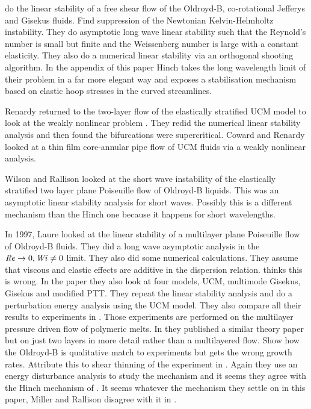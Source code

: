 \documentclass{jfm}
\newcommand\Wi{\mbox{\textit{Wi}}}
\newcommand\Rey{\mbox{\textit{Re}}}  %
\begin{document}
\citet{Azaiez1994} do the linear stability of a free shear flow of the
Oldroyd-B, co-rotational Jefferys and Gisekus fluids. Find suppression of the
Newtonian Kelvin-Helmholtz instability. They do asymptotic long wave linear
stability such that the Reynold's number is small but finite and the
Weissenberg number is large with a constant elasticity. They also do a
numerical linear stability via an orthogonal shooting algorithm. In the
appendix of this paper Hinch \citep{Azaiez1994} takes the long wavelength limit
of their problem in a far more elegant way and exposes a stabilisation
mechanism based on elastic hoop stresses in the curved streamlines.

Renardy returned to the two-layer flow of the elastically stratified UCM model
to look at the weakly nonlinear problem \citep{Renardy1995b}. They redid the
numerical linear stability analysis and then found the bifurcations were
supercritical. Coward and Renardy \citep{Coward1997} looked at a thin film
core-annular pipe flow of UCM fluids via a weakly nonlinear analysis.

Wilson and Rallison \citep{Wilson1997} looked at the short wave instability of
the elastically stratified two layer plane Poiseuille flow of Oldroyd-B liquids.
This was an asymptotic linear stability analysis for short waves. Possibly this
is a different mechanism than the Hinch one because it happens for short
wavelengths. 

In 1997, Laure \citep{Laure1997} looked at the linear stability of a multilayer
plane Poiseuille flow of Oldroyd-B fluids. They did a long wave asymptotic
analysis in the $\Rey \rightarrow 0, \Wi \neq 0$ limit. They also did some
numerical calculations. They assume that viscous and elastic effects are
additive in the dispersion relation. \citet{Ganpule1998} thinks this is wrong.
In the \citet{Ganpule1998} paper they also look at four models, UCM, multimode
Gisekus, Gisekus and modified PTT. They repeat the linear stability analysis
and do a perturbation energy analysis using the UCM model. They also compare
all their results to experiments in \citep{Khomami1997}. Those experiments are
performed on the multilayer pressure driven flow of polymeric melts. In
\citet{Ganpule1999} they published a similar theory paper but on just two
layers in more detail rather than a multilayered flow. Show how the Oldroyd-B
is qualitative match to experiments but gets the wrong growth rates. Attribute
this to shear thinning of the experiment in \citep{Khomami1997}. Again they use
an energy disturbance analysis to study the mechanism and it seems they agree
with the Hinch mechanism of \citep{Hinch1992}.  It seems whatever the mechanism
they settle on in this paper, Miller and Rallison disagree with it in
\citep{Miller2007a}. 
\end{document}
